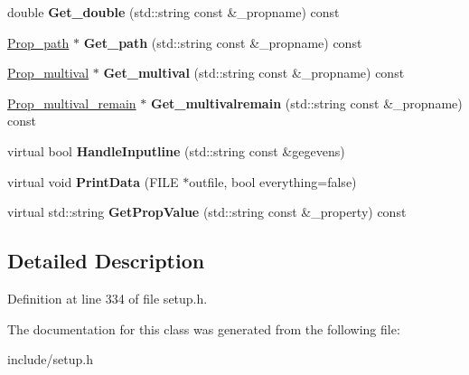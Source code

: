 \begin{DoxyCompactItemize}
\item 
\hypertarget{classSection__prop_ac7dd360e460d869bdcaa531693249a22}{double {\bfseries Get\-\_\-double} (std\-::string const \&\-\_\-propname) const }\label{classSection__prop_ac7dd360e460d869bdcaa531693249a22}

\item 
\hypertarget{classSection__prop_a65d66d7569af50d725e099e6768abfa5}{\hyperlink{classProp__path}{Prop\-\_\-path} $\ast$ {\bfseries Get\-\_\-path} (std\-::string const \&\-\_\-propname) const }\label{classSection__prop_a65d66d7569af50d725e099e6768abfa5}

\item 
\hypertarget{classSection__prop_ac3ec6edfc2dacad65780d27a7cb4e130}{\hyperlink{classProp__multival}{Prop\-\_\-multival} $\ast$ {\bfseries Get\-\_\-multival} (std\-::string const \&\-\_\-propname) const }\label{classSection__prop_ac3ec6edfc2dacad65780d27a7cb4e130}

\item 
\hypertarget{classSection__prop_a98accd38fd4610db2d38cd0e0ed33719}{\hyperlink{classProp__multival__remain}{Prop\-\_\-multival\-\_\-remain} $\ast$ {\bfseries Get\-\_\-multivalremain} (std\-::string const \&\-\_\-propname) const }\label{classSection__prop_a98accd38fd4610db2d38cd0e0ed33719}

\item 
\hypertarget{classSection__prop_aff15b82a9aa8ebf24f14fee4449a1f67}{virtual bool {\bfseries Handle\-Inputline} (std\-::string const \&gegevens)}\label{classSection__prop_aff15b82a9aa8ebf24f14fee4449a1f67}

\item 
\hypertarget{classSection__prop_a4713c2fec61a2e77dc444b53f06e7aa1}{virtual void {\bfseries Print\-Data} (F\-I\-L\-E $\ast$outfile, bool everything=false)}\label{classSection__prop_a4713c2fec61a2e77dc444b53f06e7aa1}

\item 
\hypertarget{classSection__prop_ae1e94f3165a7895ed76bfd9e39dc673a}{virtual std\-::string {\bfseries Get\-Prop\-Value} (std\-::string const \&\-\_\-property) const }\label{classSection__prop_ae1e94f3165a7895ed76bfd9e39dc673a}

\end{DoxyCompactItemize}


\subsection{Detailed Description}


Definition at line 334 of file setup.\-h.



The documentation for this class was generated from the following file\-:\begin{DoxyCompactItemize}
\item 
include/setup.\-h\end{DoxyCompactItemize}
